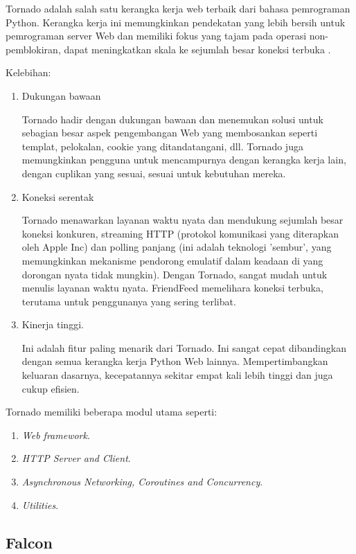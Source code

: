 Tornado adalah salah satu kerangka kerja web terbaik dari bahasa pemrograman Python. Kerangka kerja ini memungkinkan pendekatan yang lebih bersih untuk pemrograman server Web dan memiliki fokus yang tajam pada operasi non-pemblokiran, dapat meningkatkan skala ke sejumlah besar koneksi terbuka \cite{panjaitan2018sistem}.

Kelebihan:
\begin{enumerate}
\item Dukungan bawaan

Tornado hadir dengan dukungan bawaan dan menemukan solusi untuk sebagian besar aspek pengembangan Web yang membosankan seperti templat, pelokalan, cookie yang ditandatangani, dll. Tornado juga memungkinkan pengguna untuk mencampurnya dengan kerangka kerja lain, dengan cuplikan yang sesuai, sesuai untuk kebutuhan mereka.

\item Koneksi serentak

Tornado menawarkan layanan waktu nyata dan mendukung sejumlah besar koneksi konkuren, streaming HTTP (protokol komunikasi yang diterapkan oleh Apple Inc) dan polling panjang (ini adalah teknologi 'sembur', yang memungkinkan mekanisme pendorong emulatif dalam keadaan di yang dorongan nyata tidak mungkin). Dengan Tornado, sangat mudah untuk menulis layanan waktu nyata. FriendFeed memelihara koneksi terbuka, terutama untuk penggunanya yang sering terlibat.

\item Kinerja tinggi.

Ini adalah fitur paling menarik dari Tornado. Ini sangat cepat dibandingkan dengan semua kerangka kerja Python Web lainnya. Mempertimbangkan keluaran dasarnya, kecepatannya sekitar empat kali lebih tinggi dan juga cukup efisien.
\end{enumerate}

Tornado memiliki beberapa modul utama seperti:
\begin{enumerate}
\item \textit{Web framework}.
\item \textit{HTTP Server and Client}.
\item \textit{Asynchronous Networking, Coroutines and Concurrency}.
\item \textit{Utilities}.
\end{enumerate}

\subsection{Falcon}

